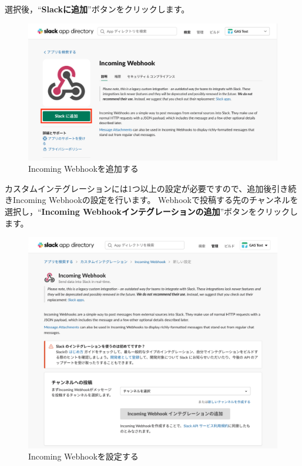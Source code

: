 \documentclass[uplatex,a4j]{jsarticle}
\begin{document}
選択後，``\textbf{Slackに追加}''ボタンをクリックします。

\begin{figure}[H]
 \centering
 \includegraphics[keepaspectratio, scale=0.7]{images/add_incoming_webhook.png}
 \caption{Incoming Webhookを追加する}
 \label{fig:add_incoming_webhook}
\end{figure}

カスタムインテグレーションには1つ以上の設定が必要ですので、追加後引き続きIncoming Webhookの設定を行います。
Webhookで投稿する先のチャンネルを選択し，``\textbf{Incoming Webhookインテグレーションの追加}''ボタンをクリックします。

\begin{figure}[H]
 \centering
 \includegraphics[keepaspectratio, scale=0.7]{images/configure_incoming_webhook.png}
 \caption{Incoming Webhookを設定する}
\end{figure}
\end{document}
